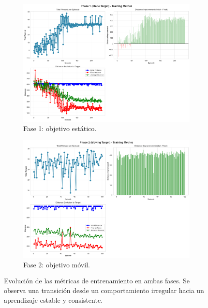 \documentclass[12pt,a4paper]{article}
\begin{document}
\begin{figure}[H]
    \centering
    \begin{subfigure}[t]{0.48\textwidth}
        \centering
        \includegraphics[width=\textwidth]{logs/episode_metrics_phase1.png}
        \caption{Fase 1: objetivo estático.}
        \label{fig:metrics_phase1}
    \end{subfigure}
    \hfill
    \begin{subfigure}[t]{0.48\textwidth}
        \centering
        \includegraphics[width=\textwidth]{logs/episode_metrics_phase2.png}
        \caption{Fase 2: objetivo móvil.}
        \label{fig:metrics_phase2}
    \end{subfigure}
    \caption{Evolución de las métricas de entrenamiento en ambas fases. Se observa una transición desde un comportamiento irregular hacia un aprendizaje estable y consistente.}
    \label{fig:training_metrics_comparison}
\end{figure}
\end{document}
